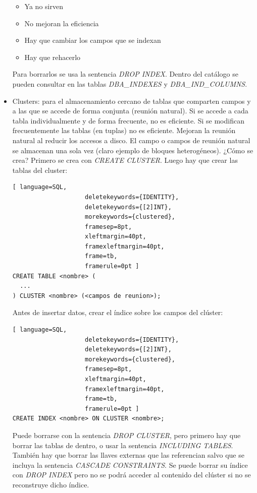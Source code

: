 \begin{itemize}
\begin{itemize}
\item Ya no sirven
\item No mejoran la eficiencia
\item Hay que cambiar los campos que se indexan
\item Hay que rehacerlo
\end{itemize}
Para borrarlos se usa la sentencia \textit{DROP INDEX}. Dentro del catálogo se pueden consultar en las tablas \textit{DBA\_INDEXES} y \textit{DBA\_IND\_COLUMNS}.
\item Clusters: para el almacenamiento cercano de tablas que comparten campos y a las que se accede de forma conjunta (reunión natural). Si se accede a cada tabla individualmente y de forma frecuente, no es eficiente. Si se modifican frecuentemente las tablas (en tuplas) no es eficiente. Mejoran la reunión natural al reducir los accesos a disco. El campo o campos de reunión natural se almacenan una sola vez (claro ejemplo de bloques heterogéneos). ¿Cómo se crea? Primero se crea con \textit{CREATE CLUSTER}. Luego hay que crear las tablas del cluster:
\begin{lstlisting}[ language=SQL,
                    deletekeywords={IDENTITY},
                    deletekeywords={[2]INT},
                    morekeywords={clustered},
                    framesep=8pt,
                    xleftmargin=40pt,
                    framexleftmargin=40pt,
                    frame=tb,
                    framerule=0pt ]
CREATE TABLE <nombre> (
  ...
) CLUSTER <nombre> (<campos de reunion>);
\end{lstlisting}
Antes de insertar datos, crear el índice sobre los campos del clúster:
\begin{lstlisting}[ language=SQL,
                    deletekeywords={IDENTITY},
                    deletekeywords={[2]INT},
                    morekeywords={clustered},
                    framesep=8pt,
                    xleftmargin=40pt,
                    framexleftmargin=40pt,
                    frame=tb,
                    framerule=0pt ]
CREATE INDEX <nombre> ON CLUSTER <nombre>;
\end{lstlisting}
Puede borrarse con la sentencia \textit{DROP CLUSTER}, pero primero hay que borrar las tablas de dentro, o usar la sentencia \textit{INCLUDING TABLES}. También hay que borrar las llaves externas que las referencian salvo que se incluya la sentencia \textit{CASCADE CONSTRAINTS}. Se puede borrar su índice con \textit{DROP INDEX} pero no se podrá acceder al contenido del clúster si no se reconstruye dicho índice.
\end{itemize}